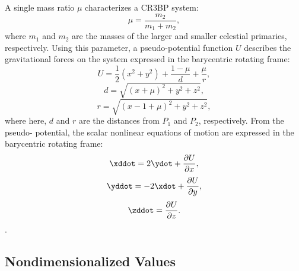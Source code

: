 A single mass ratio $\mu$ characterizes a CR3BP system:
\begin{equation}
    \mu=\frac{m_{2}}{m_{1}+m_{2}},
    \label{eq:mu}
\end{equation}
where $m_{1}$ and $m_{2}$ are the masses of the larger and smaller celestial primaries,
respectively. Using this parameter, a pseudo-potential function $U$ describes the gravitational
forces on the system expressed in the barycentric rotating frame:
\begin{equation}
    U=\frac{1}{2}(x^{2}+y^{2})+\frac{1-\mu}{d}+\frac{\mu}{r},
    \label{eq:pseud0-potential}
\end{equation}
\begin{equation}
    d=\sqrt{(x+\mu)^{2}+y^{2}+z^{2}},
    \label{eq:P1distance}
\end{equation}
\begin{equation}
    r=\sqrt{(x-1+\mu)^{2}+y^{2}+z^{2}},
    \label{eq:P2distance}
\end{equation}
where here, $d$ and $r$ are the distances from $P_{1}$ and $P_{2}$, respectively. From the pseudo-
potential, the scalar nonlinear equations of motion are expressed in the barycentric rotating
frame:
\begin{equation}
    \xddot=2\ydot+\frac{\partial U}{\partial x},
    \label{eq:EoMx}
\end{equation}
\begin{equation}
    \yddot=-2\xdot+\frac{\partial U}{\partial y},
    \label{eq:EoMy}
\end{equation}
\begin{equation}
    \zddot=\frac{\partial U}{\partial z}.
    \label{eq:EoMz}
\end{equation}.

\subsection{Nondimensionalized Values}
